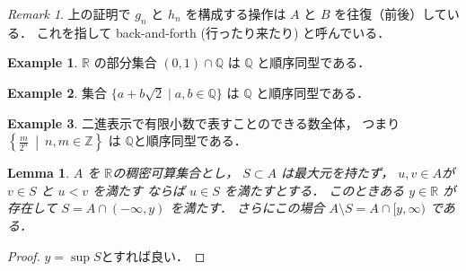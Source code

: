 \documentclass[leqno, a4paper, 12pt]{jsarticle}
\theoremstyle{plain}
\newtheorem{lem}[thm]{Lemma}
\theoremstyle{definition}
\newtheorem{exam}{Example}[section]
\theoremstyle{remark}
\newtheorem{rmk}{Remark}[section]
\newcommand{\zz}{\mathbb{Z}}
\newcommand{\qq}{\mathbb{Q}}
\newcommand{\rr}{\mathbb{R}}
\numberwithin{equation}{section}
\begin{document}
\begin{rmk}
上の証明で
$g_{n}$
と
$h_{n}$
を構成する操作は
$A$
と
$B$
を往復（前後）している．
これを指して
back-and-forth
(行ったり来たり)
と呼んでいる．
\end{rmk}

\begin{exam}
$\rr$
の部分集合
$(0,1)\cap \qq$
は
$\qq$
と順序同型である．
\end{exam}
\begin{exam}
集合
$\{a+b\sqrt{2}\mid a,b\in \qq\}$
は
$\qq$
と順序同型である．
\end{exam}
\begin{exam}
二進表示で有限小数で表すことのできる数全体，
つまり
$\left\{\frac{m}{2^n}\ \middle|\  n,m\in \zz\right\}$
は
$\qq$と順序同型である．
\end{exam}










\begin{lem}\label{lem:sum:chumitusaidai}
$A$
を
$\rr$の稠密可算集合とし，
$S\subset A$
は最大元を持たず，
$u, v\in A$が
$v\in S$
と
$u<v$
を満たす
ならば
$u\in S$
を満たすとする．
このときある
$y\in \rr$
が存在して
$S=A\cap (-\infty, y)$
を満たす．
さらにこの場合
$A\setminus S=A\cap [y, \infty)$
である．
\end{lem}
\begin{proof}
$y=\sup S$とすれば良い．
\end{proof}
\end{document}
